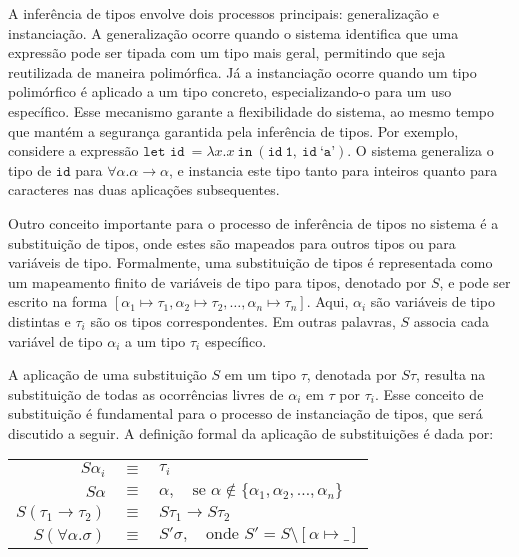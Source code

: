 A inferência de tipos envolve dois processos principais: generalização e instanciação.
A generalização ocorre quando o sistema identifica que uma expressão pode ser tipada com um tipo mais geral, permitindo que seja reutilizada de maneira polimórfica.
Já a instanciação ocorre quando um tipo polimórfico é aplicado a um tipo concreto, especializando-o para um uso específico.
Esse mecanismo garante a flexibilidade do sistema, ao mesmo tempo que mantém a segurança garantida pela inferência de tipos.
Por exemplo, considere a expressão $\texttt{let id} \ = \lambda x.x \ \texttt{in} \ (\texttt{id} \ \texttt{1}, \ \texttt{id} \ \texttt{`a'})$.
O sistema generaliza o tipo de $\texttt{id}$ para $\forall \alpha. \alpha \rightarrow \alpha$, e instancia este tipo tanto para inteiros quanto para caracteres nas duas aplicações subsequentes.

Outro conceito importante para o processo de inferência de tipos no sistema é a substituição de tipos, onde estes são mapeados para outros tipos ou para variáveis de tipo.
Formalmente, uma substituição de tipos é representada como um mapeamento finito de variáveis de tipo para tipos, denotado por $S$, e pode ser escrito na forma $[ \alpha_1 \mapsto \tau_1, \alpha_2 \mapsto \tau_2, \ldots, \alpha_n \mapsto \tau_n ]$.
Aqui, $\alpha_i$ são variáveis de tipo distintas e $\tau_i$ são os tipos correspondentes.
Em outras palavras, $S$ associa cada variável de tipo $\alpha_i$ a um tipo $\tau_i$ específico.

A aplicação de uma substituição $S$ em um tipo $\tau$, denotada por $S\tau$, resulta na substituição de todas as ocorrências livres de $\alpha_i$ em $\tau$ por $\tau_i$.
Esse conceito de substituição é fundamental para o processo de instanciação de tipos, que será discutido a seguir.
A definição formal da aplicação de substituições é dada por:

\begin{center}
  \begin{tabular}{rcl}
    $S\alpha_i$                    & $\equiv$ & $\tau_i$                                                                           \\
    $S\alpha$                      & $\equiv$ & $\alpha, \quad \text{se } \alpha \notin \{\alpha_1, \alpha_2, \ldots, \alpha_n\}$  \\
    $S(\tau_1 \rightarrow \tau_2)$ & $\equiv$ & $S\tau_1 \rightarrow S\tau_2$                                                      \\
    $S(\forall \alpha.\sigma)$     & $\equiv$ & $S' \sigma, \quad \text{onde } S' = S \setminus [\alpha \mapsto \_]$
  \end{tabular}
\end{center}

